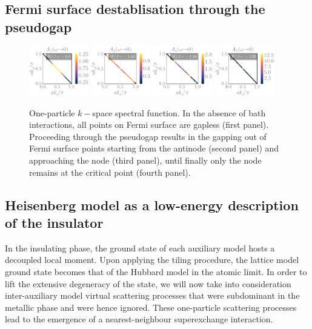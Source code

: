 \documentclass[reprint,hidelinks,onecolumn]{revtex4-2}
\begin{document}
\subsection{Fermi surface destablisation through the pseudogap}
\begin{figure}[htpb]
	\centering
	\includegraphics[width=0.23\textwidth]{kspaceDOS-1.pdf}
	\includegraphics[width=0.23\textwidth]{kspaceDOS-2.pdf}
	\includegraphics[width=0.23\textwidth]{kspaceDOS-3.pdf}
	\includegraphics[width=0.23\textwidth]{kspaceDOS-4.pdf}
	\caption{One-particle \(k-\)space spectral function. In the absence of bath interactions, all points on Fermi surface are gapless (first panel). Proceeding through the pseudogap results in the gapping out of Fermi surface points starting from the antinode (second panel) and approaching the node (third panel), until finally only the node remains at the critical point (fourth panel).}
	\label{fig:tiledSF-pdf}
\end{figure}


\subsection{Heisenberg model as a low-energy description of the insulator}

In the insulating phase, the ground state of each auxiliary model hosts a decoupled local moment. Upon applying the tiling procedure, the lattice model ground state becomes that of the Hubbard model in the atomic limit. In order to lift the extensive degeneracy of the state, we will now take into consideration inter-auxiliary model virtual scattering processes that were subdominant in the metallic phase and were hence ignored. These one-particle scattering processes lead to the emergence of a nearest-neighbour superexchange interaction.
\end{document}
